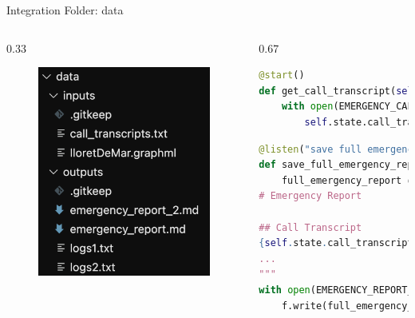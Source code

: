\begin{frame}[fragile]{Integration Folder: data}
    \begin{columns}
        \begin{column}{0.33\textwidth}
            \begin{figure}
                \includegraphics[width=\textwidth]{figures/data_folder_structure.png}
            \end{figure}
        \end{column}
        \begin{column}{0.67\textwidth}
        
    
            \begin{lstlisting}[language=Python]
@start()
def get_call_transcript(self):
    with open(EMERGENCY_CALL_TRANSCRIPTS_FILENAME, "r") as f:
        self.state.call_transcript = f.readlines()[TRANSCRIPT_INDEX]
            \end{lstlisting}
            \begin{lstlisting}[language=Python]
@listen("save full emergency report")
def save_full_emergency_report(self):
    full_emergency_report = f"""
# Emergency Report

## Call Transcript
{self.state.call_transcript}
...
"""
with open(EMERGENCY_REPORT_FILENAME, "w") as f:
    f.write(full_emergency_report)
            \end{lstlisting}
        \end{column}
    \end{columns}
\end{frame}